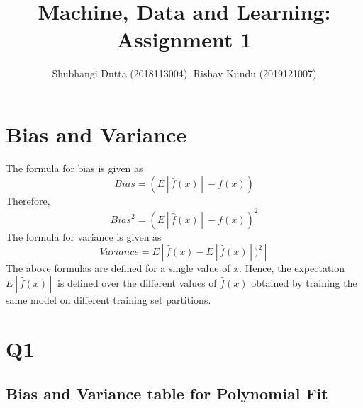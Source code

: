 \documentclass{article}
\begin{document}
\title{Machine, Data and Learning: Assignment 1}
\author{Shubhangi Dutta (2018113004), Rishav Kundu (2019121007)}
\maketitle
\newpage
\section{Bias and Variance}
The formula for bias is given as 
\newline
$$Bias=(E[\hat{f}(x)]-f(x))$$
\newline 
Therefore, 
\newline
$$
Bias^2=(E[\hat{f}(x)]-f(x))^2
$$
\newline
The formula for variance is given as 
$$
Variance=E[\hat{f}(x)-E[\hat{f}(x)])^2]
$$
The above formulas are defined for a single value of $x$. Hence, the expectation $E[\hat{f}(x)]$ is defined over the different values of $\hat{f}(x)$ obtained by training the same model on different training set partitions.
\section{Q1}
\subsection{Bias and Variance table for Polynomial Fit}
\end{document}
